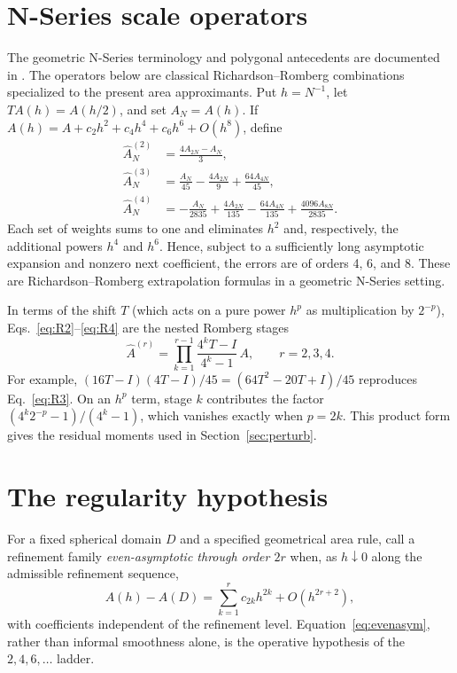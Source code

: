\documentclass[11pt]{article}
\theoremstyle{remark}
\newcommand{\Ahat}{\widehat{A}}
\begin{document}
\section{N-Series scale operators}\label{sec:operators}
The geometric N-Series terminology and polygonal antecedents are documented in
\cite{baker2026pi,baker2026scaling}. The operators below are classical
Richardson--Romberg combinations specialized to the present area approximants.
Put $h=N^{-1}$, let $TA(h)=A(h/2)$, and set $A_N=A(h)$. If
$A(h)=A+c_2h^2+c_4h^4+c_6h^6+O(h^8)$, define
\begin{align}
\Ahat^{(2)}_N &= \frac{4A_{2N}-A_N}{3}, \label{eq:R2}\\
\Ahat^{(3)}_N &= \frac{A_N}{45}-\frac{4A_{2N}}{9}+\frac{64A_{4N}}{45}, \label{eq:R3}\\
\Ahat^{(4)}_N &= -\frac{A_N}{2835}+\frac{4A_{2N}}{135}-\frac{64A_{4N}}{135}+\frac{4096A_{8N}}{2835}. \label{eq:R4}
\end{align}
Each set of weights sums to one and eliminates $h^2$ and, respectively, the additional powers
$h^4$ and $h^6$. Hence, subject to a sufficiently long asymptotic expansion and nonzero next
coefficient, the errors are of orders 4, 6, and 8. These are Richardson--Romberg extrapolation
formulas in a geometric N-Series setting.

In terms of the shift $T$ (which acts on a pure power $h^p$ as multiplication by $2^{-p}$),
Eqs.~\eqref{eq:R2}--\eqref{eq:R4} are the nested Romberg stages
\[
\Ahat^{(r)}=\prod_{k=1}^{r-1}\frac{4^{k}T-I}{4^{k}-1}\,A,\qquad r=2,3,4 .
\]
For example, $(16T-I)(4T-I)/45=(64T^2-20T+I)/45$ reproduces Eq.~\eqref{eq:R3}. On an $h^p$
term, stage $k$ contributes the factor $(4^k2^{-p}-1)/(4^k-1)$, which vanishes exactly when
$p=2k$. This product form gives the residual moments used in Section~\ref{sec:perturb}.

\section{The regularity hypothesis}\label{sec:regularity}
For a fixed spherical domain $D$ and a specified geometrical area rule, call a refinement
family \emph{even-asymptotic through order $2r$} when, as $h\downarrow0$ along the admissible
refinement sequence,
\begin{equation}\label{eq:evenasym}
A(h)-A(D)=\sum_{k=1}^{r}c_{2k}h^{2k}+O(h^{2r+2}),
\end{equation}
with coefficients independent of the refinement level. Equation~\eqref{eq:evenasym}, rather
than informal smoothness alone, is the operative hypothesis of the $2,4,6,\dots$ ladder.
\end{document}
